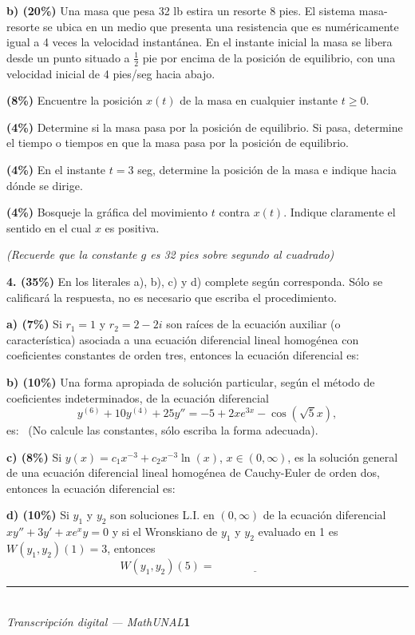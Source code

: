 \documentclass[11pt]{article}
\newcommand{\rp}{\underline{\hspace{3cm}}}
\begin{document}
\newpage

\noindent\textbf{b) (20\%)} Una masa que pesa 32 lb estira un resorte 8 pies. El sistema masa-resorte se ubica en un medio que presenta una resistencia que es numéricamente igual a 4 veces la velocidad instantánea. En el instante inicial la masa se libera desde un punto situado a $\frac{1}{2}$ pie por encima de la posición de equilibrio, con una velocidad inicial de 4 pies/seg hacia abajo.
\begin{opciones}
\item \textbf{(8\%)} Encuentre la posición $x(t)$ de la masa en cualquier instante $t\geq 0$.
\item \textbf{(4\%)} Determine si la masa pasa por la posición de equilibrio. Si pasa, determine el tiempo o tiempos en que la masa pasa por la posición de equilibrio.
\item \textbf{(4\%)} En el instante $t=3$ seg, determine la posición de la masa e indique hacia dónde se dirige.
\item \textbf{(4\%)} Bosqueje la gráfica del movimiento $t$ contra $x(t)$. Indique claramente el sentido en el cual $x$ es positiva.
\end{opciones}
\textit{(Recuerde que la constante $g$ es 32 pies sobre segundo al cuadrado)}

\vspace{5.5cm}

\newpage

\noindent\textbf{4. (35\%)} En los literales a), b), c) y d) complete según corresponda. Sólo se calificará la respuesta, no es necesario que escriba el procedimiento.

\vspace{0.25cm}
\noindent\textbf{a) (7\%)} Si $r_1=1$ y $r_2=2-2i$ son raíces de la ecuación auxiliar (o característica) asociada a una ecuación diferencial lineal homogénea con coeficientes constantes de orden tres, entonces la ecuación diferencial es: \rp

\vspace{0.3cm}
\noindent\textbf{b) (10\%)} Una forma apropiada de solución particular, según el método de coeficientes indeterminados, de la ecuación diferencial
\[
y^{(6)}+10y^{(4)}+25y''=-5+2xe^{3x}-\cos(\sqrt5 x),
\]
es: \rp\ (No calcule las constantes, sólo escriba la forma adecuada).

\vspace{0.3cm}
\noindent\textbf{c) (8\%)} Si $y(x)=c_1x^{-3}+c_2x^{-3}\ln(x)$, $x\in(0,\infty)$, es la solución general de una ecuación diferencial lineal homogénea de Cauchy-Euler de orden dos, entonces la ecuación diferencial es: \rp

\vspace{0.3cm}
\noindent\textbf{d) (10\%)} Si $y_1$ y $y_2$ son soluciones L.I. en $(0,\infty)$ de la ecuación diferencial $xy''+3y'+xe^xy=0$ y si el Wronskiano de $y_1$ y $y_2$ evaluado en 1 es $W(y_1,y_2)(1)=3$, entonces
\[
W(y_1,y_2)(5)=\rp
\]

\vfill
\rule{\linewidth}{0.4pt}\\[1pt]
{\scriptsize\textit{Transcripción digital --- MathUNAL}\hfill\textcolor{unalblue}{\textbf{1}}}
\end{document}
